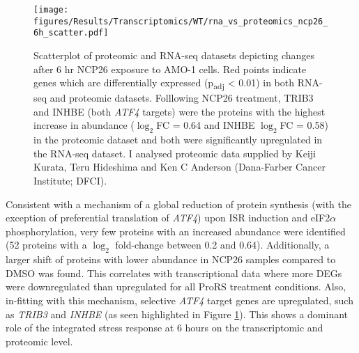 \begin{figure}[htb]
\centering
\texttt{[image: figures/Results/Transcriptomics/WT/rna\_vs\_proteomics\_ncp26\_6h\_scatter.pdf]}
\caption[]{Scatterplot of proteomic and RNA-seq datasets depicting changes after 6 hr NCP26 exposure to AMO-1 cells.
Red points indicate genes which are differentially expressed (p\textsubscript{adj} < 0.01) in both RNA-seq and proteomic datasets.
Folllowing NCP26 treatment, TRIB3 and INHBE (both \textit{ATF4} targets) were the proteins with the highest increase in abundance ($\log_{2}$FC = 0.64 and INHBE  $\log_{2}$FC = 0.58) in the proteomic dataset and both were significantly upregulated in the RNA-seq dataset.
I analysed proteomic data supplied by Keiji Kurata, Teru Hideshima and Ken C Anderson (Dana-Farber Cancer Institute; DFCI).
}
\label{fig:proteomic_rna_scatter}
\end{figure}
%
Consistent with a mechanism of a global reduction of protein synthesis (with the exception of preferential translation of \textit{ATF4}) upon  ISR induction and eIF2$\alpha$ phosphorylation, very few proteins with an increased abundance were identified (52 proteins with a $\log_{2}$ fold-change between 0.2 and 0.64).
Additionally, a larger shift of proteins with lower abundance in NCP26 samples compared to DMSO was found.
This correlates with transcriptional data where more DEGs were downregulated than upregulated for all ProRS treatment conditions.
Also, in-fitting with this mechanism, selective \textit{ATF4} target genes are upregulated, such as \textit{TRIB3} and \textit{INHBE} (as seen highlighted in Figure \ref{fig:proteomic_rna_scatter}).
This shows a dominant role of the integrated stress response at 6 hours on the transcriptomic and proteomic level.



